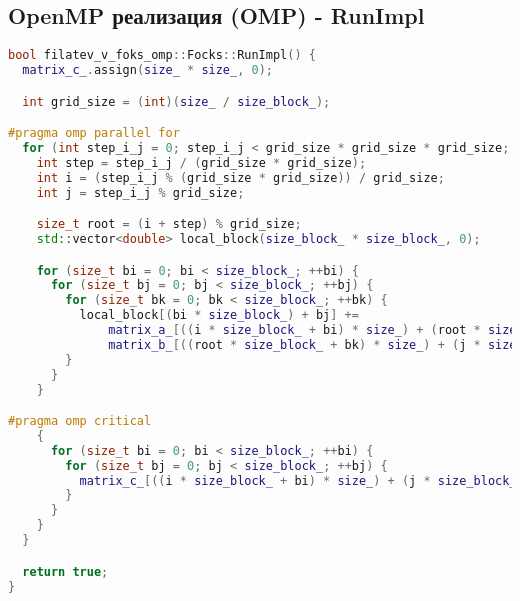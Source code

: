 \documentclass[12pt]{article}
\begin{document}
\subsection{OpenMP реализация (OMP) - RunImpl}
\begin{lstlisting}[language=C++]
bool filatev_v_foks_omp::Focks::RunImpl() {
  matrix_c_.assign(size_ * size_, 0);

  int grid_size = (int)(size_ / size_block_);

#pragma omp parallel for
  for (int step_i_j = 0; step_i_j < grid_size * grid_size * grid_size; ++step_i_j) {
    int step = step_i_j / (grid_size * grid_size);
    int i = (step_i_j % (grid_size * grid_size)) / grid_size;
    int j = step_i_j % grid_size;

    size_t root = (i + step) % grid_size;
    std::vector<double> local_block(size_block_ * size_block_, 0);

    for (size_t bi = 0; bi < size_block_; ++bi) {
      for (size_t bj = 0; bj < size_block_; ++bj) {
        for (size_t bk = 0; bk < size_block_; ++bk) {
          local_block[(bi * size_block_) + bj] +=
              matrix_a_[((i * size_block_ + bi) * size_) + (root * size_block_) + bk] *
              matrix_b_[((root * size_block_ + bk) * size_) + (j * size_block_) + bj];
        }
      }
    }

#pragma omp critical
    {
      for (size_t bi = 0; bi < size_block_; ++bi) {
        for (size_t bj = 0; bj < size_block_; ++bj) {
          matrix_c_[((i * size_block_ + bi) * size_) + (j * size_block_) + bj] += local_block[(bi * size_block_) + bj];
        }
      }
    }
  }

  return true;
}
\end{lstlisting}
\newpage
\end{document}
